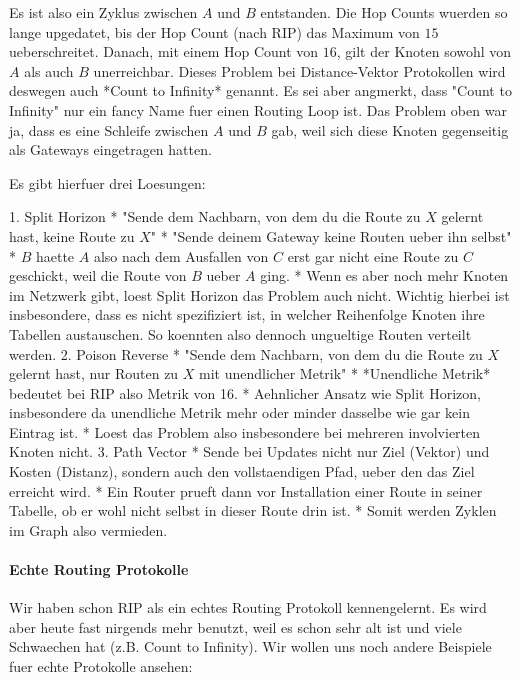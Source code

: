 Es ist also ein Zyklus zwischen $A$ und $B$ entstanden. Die Hop Counts wuerden
so lange upgedatet, bis der Hop Count (nach RIP) das Maximum von $15$
ueberschreitet. Danach, mit einem Hop Count von $16$, gilt der Knoten sowohl von
$A$ als auch $B$ unerreichbar. Dieses Problem bei Distance-Vektor Protokollen
wird deswegen auch *Count to Infinity* genannt. Es sei aber angmerkt, dass
"Count to Infinity" nur ein fancy Name fuer einen Routing Loop ist. Das Problem
oben war ja, dass es eine Schleife zwischen $A$ und $B$ gab, weil sich diese
Knoten gegenseitig als Gateways eingetragen hatten.

Es gibt hierfuer drei Loesungen:

1. Split Horizon
   * "Sende dem Nachbarn, von dem du die Route zu $X$ gelernt hast, keine Route
     zu $X$"
   * "Sende deinem Gateway keine Routen ueber ihn selbst"
   * $B$ haette $A$ also nach dem Ausfallen von $C$ erst gar nicht eine Route zu
     $C$ geschickt, weil die Route von $B$ ueber $A$ ging.
   * Wenn es aber noch mehr Knoten im Netzwerk gibt, loest Split Horizon das
     Problem auch nicht. Wichtig hierbei ist insbesondere, dass es nicht
     spezifiziert ist, in welcher Reihenfolge Knoten ihre Tabellen
     austauschen. So koennten also dennoch ungueltige Routen verteilt werden.
2. Poison Reverse
   * "Sende dem Nachbarn, von dem du die Route zu $X$ gelernt hast, nur Routen
     zu $X$ mit unendlicher Metrik"
   * *Unendliche Metrik* bedeutet bei RIP also Metrik von 16.
   * Aehnlicher Ansatz wie Split Horizon, insbesondere da unendliche Metrik
     mehr oder minder dasselbe wie gar kein Eintrag ist.
   * Loest das Problem also insbesondere bei mehreren involvierten Knoten nicht.
3. Path Vector
   * Sende bei Updates nicht nur Ziel (Vektor) und Kosten (Distanz), sondern
     auch den vollstaendigen Pfad, ueber den das Ziel erreicht wird.
   * Ein Router prueft dann vor Installation einer Route in seiner Tabelle, ob
     er wohl nicht selbst in dieser Route drin ist.
   * Somit werden Zyklen im Graph also vermieden.

\paragraph{Echte Routing Protokolle} 

Wir haben schon RIP als ein echtes Routing Protokoll kennengelernt. Es wird aber
heute fast nirgends mehr benutzt, weil es schon sehr alt ist und viele
Schwaechen hat (z.B. Count to Infinity). Wir wollen uns noch andere Beispiele
fuer echte Protokolle ansehen:

